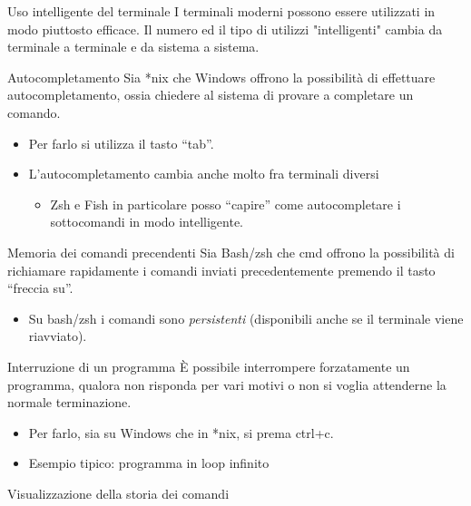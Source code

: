 \documentclass[xcolor=dvipsnames,presentation]{beamer}
\begin{document}
\begin{frame}{Uso intelligente del terminale}
    I terminali moderni possono essere utilizzati in modo piuttosto efficace.
    Il numero ed il tipo di utilizzi "intelligenti" cambia da terminale a terminale e da sistema a sistema.
    \begin{block}{Autocompletamento}
        \scriptsize{}
        Sia *nix che Windows offrono la possibilità di effettuare autocompletamento, ossia chiedere al sistema di provare a completare un comando.
        \begin{itemize}
            \item Per farlo si utilizza il tasto ``tab''.
            \item L'autocompletamento cambia anche molto fra terminali diversi
            \begin{itemize}
                \scriptsize{}
                \item Zsh e Fish in particolare posso ``capire'' come autocompletare i sottocomandi in modo intelligente.
            \end{itemize}
        \end{itemize}
    \end{block}
    \begin{block}{Memoria dei comandi precendenti}
        \scriptsize{}
        Sia Bash/zsh che cmd offrono la possibilità di richiamare rapidamente i comandi inviati precedentemente premendo il tasto ``freccia su''.
        \begin{itemize}
            \item  Su bash/zsh i comandi sono \emph{persistenti} (disponibili anche se il terminale viene riavviato).
        \end{itemize}
    \end{block}
    \begin{block}{Interruzione di un programma}
        \scriptsize{}
        È possibile interrompere forzatamente un programma, qualora non risponda per vari motivi o non si voglia attenderne la normale terminazione.
        \begin{itemize}
            \item Per farlo, sia su Windows che in *nix, si prema ctrl+c.
            \item Esempio tipico: programma in loop infinito
        \end{itemize}
    \end{block}
    \begin{block}{Visualizzazione della storia dei comandi}

\end{block}
\end{frame}
\end{document}
